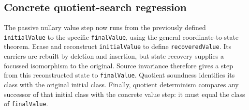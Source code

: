 \subsection{Concrete quotient-search regression}
The passive nullary value step now runs from the previously defined
\texttt{initialValue} to the specific \texttt{finalValue}, using the general
coordinate-to-state theorem. Erase and reconstruct \texttt{initialValue} to
define \texttt{recoveredValue}. Its carriers are rebuilt by deletion and
insertion, but state recovery supplies a focussed isomorphism to the original.
Source invariance therefore gives a step from this reconstructed state to
\texttt{finalValue}. Quotient soundness identifies its class with the original
initial class. Finally, quotient determinism compares any successor of that
initial class with the concrete value step: it must equal the class of
\texttt{finalValue}.
